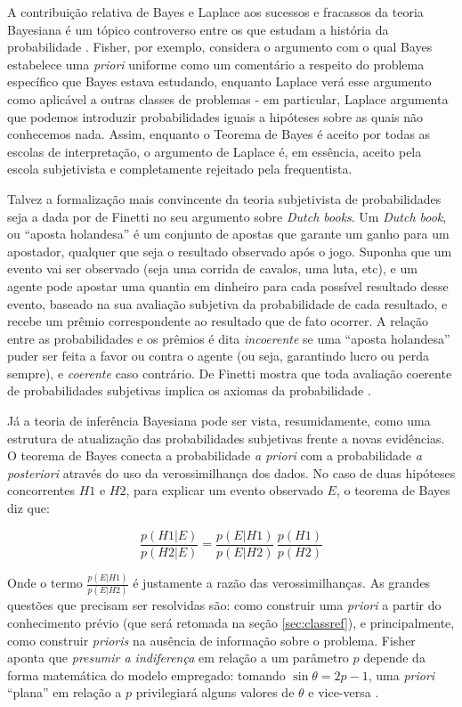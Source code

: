 A contribuição relativa de Bayes e Laplace aos sucessos
e fracassos da teoria Bayesiana é um tópico controverso	entre os que estudam a história da probabilidade \citep{Zabell09}.
Fisher, por exemplo, considera o argumento com o qual Bayes estabelece uma {\em priori} uniforme como um comentário
a respeito do problema específico que Bayes estava estudando, enquanto Laplace verá esse argumento
como aplicável a outras classes de problemas \citep{Laplace1814} - em particular, Laplace argumenta que podemos
introduzir probabilidades iguais a hipóteses sobre as quais não conhecemos nada. 
Assim, enquanto o Teorema de Bayes é aceito por todas as escolas de interpretação, o argumento de Laplace
é, em essência, aceito pela escola subjetivista \citep{Aldrich08} e completamente
rejeitado pela frequentista. 

Talvez a formalização mais convincente da teoria subjetivista de probabilidades seja a dada por de Finetti no seu argumento sobre
{\em Dutch books}. Um {\em Dutch book}, ou ``aposta holandesa'' 
é um conjunto de apostas que garante um ganho para um apostador, qualquer que seja o
resultado observado após o jogo. Suponha que um evento vai ser observado (seja uma corrida de cavalos, uma luta, etc), e um
agente pode apostar uma quantia em dinheiro para cada possível resultado desse evento, baseado na sua avaliação subjetiva da
probabilidade de cada resultado, e recebe um prêmio correspondente ao resultado que de fato ocorrer. A relação entre as 
probabilidades e os prêmios é dita {\em incoerente} se uma ``aposta holandesa'' puder ser feita a favor ou contra o agente
(ou seja, garantindo lucro ou perda sempre), e {\em coerente} caso contrário. De Finetti mostra que toda avaliação 
coerente de probabilidades subjetivas implica os axiomas da probabilidade \citep{deFinetti37}.

Já a teoria de inferência Bayesiana pode ser vista, resumidamente, como uma estrutura de atualização das probabilidades subjetivas
frente a novas evidências. O teorema de Bayes conecta a probabilidade {\em a priori} com a probabilidade {\em a posteriori}
através do uso da verossimilhança dos dados. No caso de duas hipóteses concorrentes $H1$ e $H2$, para explicar um evento observado
$E$, o teorema de Bayes diz que:

\begin{equation}
	\frac{p(H1|E)}{p(H2|E)}= \frac{p(E|H1)}{p(E|H2)} \,\frac{p(H1)}{p(H2)}
\end{equation}

Onde o termo $\frac{p(E|H1)}{p(E|H2)}$ é justamente a razão das verossimilhanças.
As grandes questões que precisam ser resolvidas são: como construir uma {\em priori}
a partir do conhecimento prévio (que será retomada na seção \ref{sec:classref}), e principalmente, como construir {\em prioris}
na ausência de informação sobre o problema. Fisher aponta que {\em presumir a indiferença} em relação a um parâmetro
$p$ depende da forma matemática do modelo empregado: tomando $\sin \theta = 2p-1$, uma {\em priori} ``plana'' em relação a $p$ 
privilegiará alguns valores de $\theta$ e vice-versa \citep{Fisher1922}.

